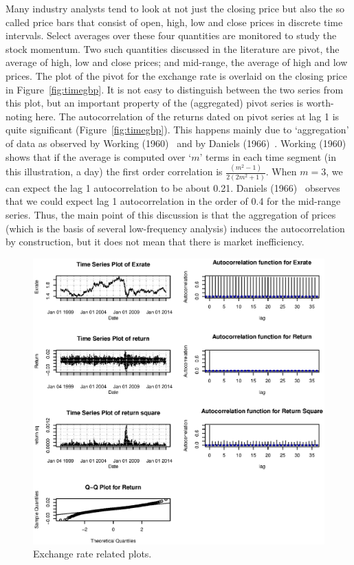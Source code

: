 Many industry analysts tend to look at not just the closing price but also the so called price bars that consist of open, high, low and close prices in discrete time intervals. Select averages over these four quantities are monitored to study the stock momentum. Two such quantities discussed in the literature are pivot, the average of high, low and close prices; and mid-range, the average of high and low prices. The plot of the pivot for the exchange rate is overlaid on the closing price in Figure~\ref{fig:timegbp}. It is not easy to distinguish between the two series from this plot, but an important property of the (aggregated) pivot series is worth-noting here. The autocorrelation of the returns dated on pivot series at lag 1 is quite significant (Figure~\ref{fig:timegbp}). This happens mainly due to `aggregation' of data as observed by Working (1960)~\cite{working1960note} and by Daniels (1966)~\cite{daniels1966autocorrelation}. Working (1960) \cite{working1960note} shows that if the average is computed over `$m$' terms in each time segment (in this illustration, a day) the first order correlation is $\frac{(m^2-1)}{2(2m^2+1)}$. When $m= 3$, we can expect the lag 1 autocorrelation to be about 0.21. Daniels (1966)~\cite{daniels1966autocorrelation} observes that we could expect lag 1 autocorrelation in the order of 0.4 for the mid-range series. Thus, the main point of this discussion is that the aggregation of prices (which is the basis of several low-frequency analysis) induces the autocorrelation by construction, but it does not mean that there is market inefficiency.
	\begin{figure}[!ht]
	\centering
	\includegraphics[width=\textwidth]{chapters/chapter_uvts/figures/31graphs.eps}
	\caption{Exchange rate related plots.\label{fig:exchrate}}
	\end{figure}


